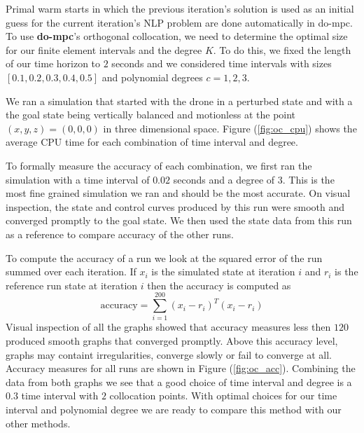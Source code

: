 \documentclass[]{article}
\newcommand{\dompc}{{\bf do-mpc}}
\begin{document}
Primal warm starts in which the previous iteration's solution is used as an initial guess for the current iteration's NLP problem are done automatically in do-mpc.  To use {\dompc}'s orthogonal collocation, we need to determine the optimal size for our finite element intervals and the degree $K$.  To do this, we fixed the length of our time horizon to $2$ seconds and we considered  time intervals  with sizes $[0.1, 0.2, 0.3, 0.4, 0.5]$ and polynomial degrees $c = 1, 2, 3$.  

We ran a  simulation that started with the drone in a perturbed state and with a the goal state being vertically balanced and motionless at the point $(x,y,z) = (0, 0, 0)$ in three dimensional space.  Figure (\ref{fig:oc_cpu}) shows the average CPU time for each combination of time interval and degree.

To formally measure the accuracy of each combination, we first ran the simulation with a time interval of $0.02$ seconds and a degree of $3$. This is the most fine grained simulation we ran and should be the most accurate. On visual inspection, the state and control curves produced by this run were smooth and converged promptly to the goal state. We then used the state data from this run as a reference to compare accuracy of the other runs. 

To compute the accuracy of a run we look at the squared error of the run summed over each iteration.  If $x_i$ is the simulated state at iteration $i$ and $r_i$ is the reference run state at iteration $i$ then the accuracy is computed as 
\[\text{accuracy} =  \sum_{i=1}^{200} (x_i - r_i)^T(x_i - r_i)\]
Visual inspection of all the graphs showed that  accuracy measures less then $120$ produced smooth graphs that converged promptly. Above this accuracy level, graphs may containt irregularities, converge slowly or fail to converge at all. Accuracy measures for all runs are shown in Figure (\ref{fig:oc_acc}). Combining the data from both graphs we see that a good choice of time interval and degree is a $0.3$  time interval with $2$ collocation points.  With optimal choices for our time interval and polynomial degree we are ready to compare this method with our other methods.
\end{document}
